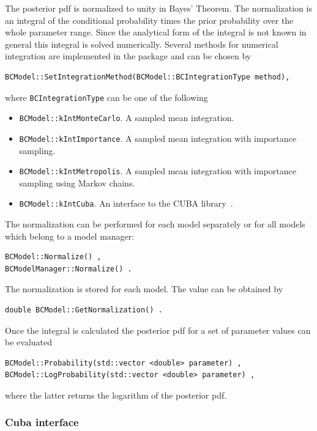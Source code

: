 \documentclass[11pt, a4paper]{article}
\begin{document}
The posterior pdf is normalized to unity in Bayes' Theorem. The
normalization is an integral of the conditional probability times the
prior probability over the whole parameter range. Since the analytical
form of the integral is not known in general this integral is solved
numerically. Several methods for numerical integration are implemented
in the package and can be chosen by
%
\begin{verbatim}
BCModel::SetIntegrationMethod(BCModel::BCIntegrationType method),
\end{verbatim}

\noindent
where \verb|BCIntegrationType| can be one of the following
%
\begin{itemize}
\item \verb|BCModel::kIntMonteCarlo|. A sampled mean integration.
\item \verb|BCModel::kIntImportance|. A sampled mean integration
 with importance sampling.
\item \verb|BCModel::kIntMetropolis|. A sampled mean integration
 with importance sampling using Markov chains.
\item \verb|BCModel::kIntCuba|. An interface to the CUBA
  library~\cite{CUBA,CUBAweb}.
\end{itemize}
%

\noindent
The normalization can be performed for each model separately or for
all models which belong to a model manager:
%
\begin{verbatim}
BCModel::Normalize() ,
BCModelManager::Normalize() .
\end{verbatim}

\noindent
The normalization is stored for each model. The value can be obtained
by
%
\begin{verbatim}
double BCModel::GetNormalization() .
\end{verbatim}

\noindent
Once the integral is calculated the posterior pdf for a set of
parameter values can be evaluated
%
\begin{verbatim}
BCModel::Probability(std::vector <double> parameter) ,
BCModel::LogProbability(std::vector <double> parameter) ,
\end{verbatim}
%
where the latter returns the logarithm of the posterior pdf.

\subsubsection{Cuba interface}
\label{section:cubainterface}
\end{document}
